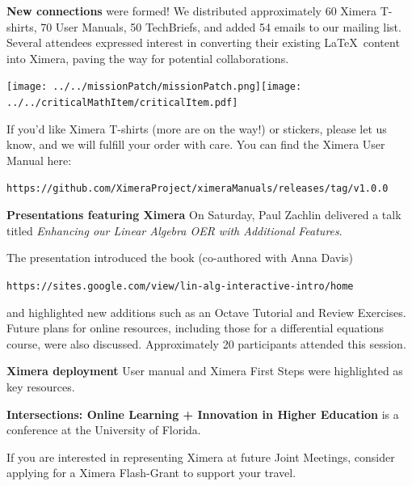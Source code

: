 \documentclass{techbrief}
\begin{document}
\begin{xframe}
    {\bf New connections} were formed! We distributed approximately 60
    Ximera T-shirts, 70 User Manuals, 50 TechBriefs, and added 54 emails to our
    mailing list. Several attendees expressed interest in converting their
    existing
    \LaTeX\ content into Ximera, paving the way for potential collaborations.
    \begin{center}

        \texttt{[image: ../../missionPatch/missionPatch.png]}\qquad\texttt{[image: ../../criticalMathItem/criticalItem.pdf]}
    \end{center}
    If you'd like Ximera T-shirts (more are on the way!) or stickers, please
    let us know, and we will
    fulfill your order with care. You can find the Ximera User Manual here:
    \begin{center}\small
        \texttt{https://github.com/XimeraProject/ximeraManuals/releases/tag/v1.0.0}
    \end{center}
\end{xframe}

\begin{xframe}
    \textbf{Presentations featuring Ximera}
    On Saturday, Paul Zachlin delivered a talk titled \textit{Enhancing our
        Linear
        Algebra OER with Additional Features}.

    The presentation introduced the book (co-authored with Anna Davis)
    \begin{center}
    \texttt{https://sites.google.com/view/lin-alg-interactive-intro/home}
    \end{center}
    and highlighted new additions such as
    an Octave Tutorial and Review Exercises. Future plans for online resources,
    including those for a differential equations course, were also discussed.
    Approximately 20 participants attended this session.
\end{xframe}

\vfil

\begin{xframe}
    \textbf{Ximera deployment}
    User manual and Ximera First Steps were highlighted as key resources.
\end{xframe}

\vfil
\begin{xframe}
    {\bfseries Intersections: Online Learning + Innovation in Higher
        Education} is a conference at the University of Florida.

    If you are interested in representing Ximera at future Joint Meetings,
    consider applying for a Ximera Flash-Grant to support your travel.
\end{xframe}
\end{document}
